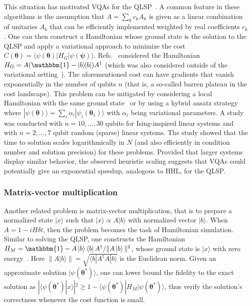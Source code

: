 \documentclass[prx,twocolumn,floatfix,superscriptaddress,longbibliography]{revtex4-1}
\renewcommand{\vec}[1]{\boldsymbol{#1}}  %
\newcommand{\<}{\langle}
\renewcommand{\>}{\rangle}
\newcommand{\ket}[1]{|#1\rangle}               %
\newcommand{\bra}[1]{\langle #1|}              %
\newcommand{\dya}[1]{\ket{#1}\!\bra{#1}}
\renewcommand{\vec}[1]{\boldsymbol{#1}}  %
\newcommand{\ad}{^\dagger}
\newcommand*{\id}{\mathbbm{1}}
\begin{document}
This situation has motivated VQAs for the QLSP~\cite{bravo-prieto2019, Xiaosi, huang2019near}. A common feature in these algorithms is the assumption that $A = \sum_k c_k A_k$ is given as a linear combination of unitaries $A_k$ that can be efficiently implemented weighted by real coefficients $c_k$. One can then construct a Hamiltonian whose ground state is the solution to the QLSP and apply a variational approach to minimize the cost $C(\vec{\theta})=\langle \psi(\vec{\theta})|H_G|\psi(\vec{\psi})\rangle$. Refs.~\cite{Xiaosi,bravo-prieto2019,huang2019near}  considered the Hamiltonian $H_G = A(\id - \dya{b})A\ad$ (which was also considered outside of the variational setting~\cite{subasi}).  The aforementioned cost can have gradients that vanish exponentially in the number of qubits $n$ (that is, a so-called barren plateau in the cost landscape). This problem can be mitigated by considering a local Hamiltonian with the same ground state~\cite{bravo-prieto2019} or by using a hybrid ansatz strategy~\cite{huang2019near}  where  $\ket{\psi(\vec{\theta})} = \sum_i \alpha_i \ket{\psi_i(\vec{\theta}_1)}$ with $\alpha_i$ being variational parameters. A study~\cite{bravo-prieto2019} was conducted with $n=10, \ldots, 30$ qubits for Ising-inspired linear systems and with $n=2,\ldots, 7$ qubit random (sparse) linear systems. The study showed that the time to solution scales logarithmically in $N$ (and also efficiently in condition number and solution precision) for these problems. Provided that larger systems display similar behavior, the observed heuristic scaling suggests that VQAs could potentially give an exponential speedup, analogous to HHL, for the QLSP.




\subsubsection{ Matrix-vector multiplication} Another related  problem is matrix-vector multiplication, that is to prepare a normalized state $\ket{x}$ such that $\ket{x}\propto A\ket{b}$ with normalized vector $\ket{b}$. When \mbox{$A=1-iH\delta t$}, then the problem becomes the task of Hamiltonian simulation. Similar to solving the QLSP, one constructs the Hamiltonian $H_{M}=\id-{A\left|b\right\rangle\left\langle b\right| A^{\dagger}}/{\| A\left|b\right\rangle \|^{2}}$, whose ground state is  $\ket{x}$ with zero energy~\cite{Xiaosi}. Here $\|A\ket{b}\|=\sqrt{\bra{b}A^\dag A\ket{b}}$ is the Euclidean norm. Given an approximate solution $\ket{\psi(\vec \theta^*)}$, one can lower bound the fidelity to the exact solution as $|\bra{\psi(\vec \theta^*)}x\rangle|^2\ge 1- \bra{\psi(\vec \theta^*)}H_{M}\ket{\psi(\vec \theta^*)}$, thus verify the solution's correctness whenever the cost function is small. 
\end{document}
